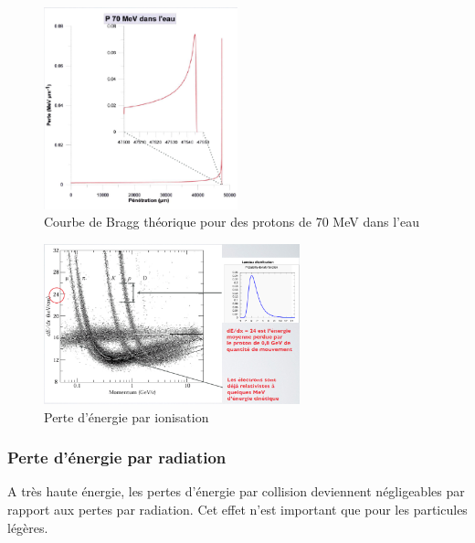 \begin{figure}[H]
    \centering
    \includegraphics[width=0.5\textwidth]{Images1/picbragg.PNG}
    \caption{Courbe de Bragg théorique pour des protons de 70 MeV dans l'eau}
    \label{fig:pic_bragg}
\end{figure}

\begin{figure}[H]
    \centering
    \includegraphics[width=0.66\textwidth]{Images1/perteionisation.PNG}
    \caption{Perte d'énergie par ionisation}
    \label{fig:pertes_ionisation}
\end{figure}


\subsubsection{Perte d'énergie par radiation}

A très haute énergie, les pertes d'énergie par collision deviennent négligeables par rapport aux pertes par radiation. Cet effet n'est important que pour les particules légères.

